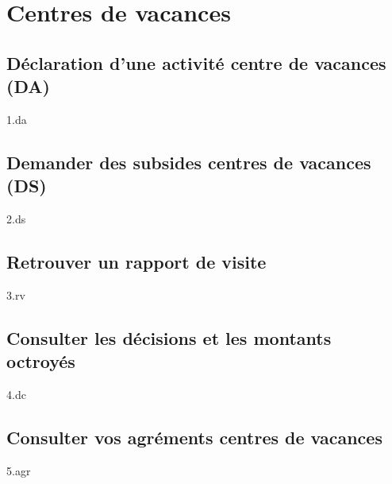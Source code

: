 \chapter{Centres de vacances} \vspace{1.5cm} \minitoc \newpage

\section{Déclaration d'une activité centre de vacances (DA)}
{1.da}

\section{Demander des subsides centres de vacances (DS)}\label{DS_CDV}
{2.ds}

\section{Retrouver un rapport de visite}
{3.rv}

\section{Consulter les décisions et les montants octroyés}
{4.dc}

\section{Consulter vos agréments centres de vacances}
{5.agr}